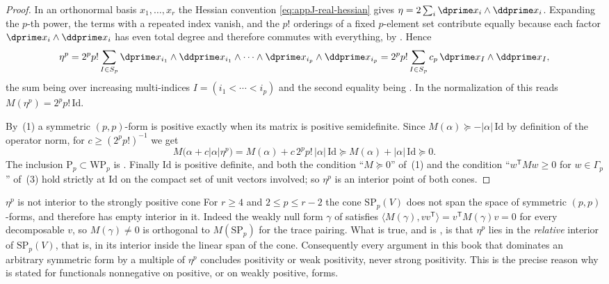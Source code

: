 \begin{proof}
In an orthonormal basis $x_1,\ldots,x_r$ the Hessian convention
\eqref{eq:appJ-real-hessian} gives
$\eta=2\sum_i\dprime x_i\wedge\ddprime x_i$.  Expanding the $p$-th power, the
terms with a repeated index vanish, and the $p!$ orderings of a fixed
$p$-element set contribute equally because each factor
$\dprime x_i\wedge\ddprime x_i$ has even total degree and therefore commutes
with everything, by .  Hence
\[
 \eta^{p}=2^{p}p!\sum_{I\in S_p}
   \dprime x_{i_1}\wedge\ddprime x_{i_1}\wedge\cdots
   \wedge\dprime x_{i_p}\wedge\ddprime x_{i_p}
 =2^{p}p!\sum_{I\in S_p}c_p\,\dprime x_I\wedge\ddprime x_I,
\]
the sum being over increasing multi-indices $I=(i_1<\cdots<i_p)$ and the
second equality being .  In the normalization of
 this reads $M(\eta^p)=2^pp!\,\mathrm{Id}$.

By \,(1) a symmetric $(p,p)$-form is
positive exactly when its matrix is positive semidefinite.  Since
$M(\alpha)\succeq-|\alpha|\,\mathrm{Id}$ by definition of the operator norm,
for $c\ge(2^pp!)^{-1}$ we get
\[
 M\bigl(\alpha+c|\alpha|\eta^p\bigr)
 =M(\alpha)+c\,2^pp!\,|\alpha|\,\mathrm{Id}
 \succeq M(\alpha)+|\alpha|\,\mathrm{Id}\succeq0 .
\]
The inclusion $\mathrm{P}_p\subset\mathrm{WP}_p$ is
.  Finally $\mathrm{Id}$ is positive
definite, and both the condition ``$M\succeq0$'' of
\,(1) and the condition
``$w^{\mathsf T}Mw\ge0$ for $w\in\Gamma_p$'' of
\,(3) hold strictly at $\mathrm{Id}$ on
the compact set of unit vectors involved; so $\eta^p$ is an interior point of
both cones.
\end{proof}

\par\noindent\begin{minipage}{\linewidth}
\begin{warning}{$\eta^p$ is not interior to the strongly positive cone}
For $r\ge4$ and $2\le p\le r-2$ the cone $\mathrm{SP}_p(V)$ does not span the
space of symmetric $(p,p)$-forms, and therefore has empty interior in it.
Indeed the weakly null form $\gamma$ of  satisfies
$\langle M(\gamma),vv^{\mathsf T}\rangle=v^{\mathsf T}M(\gamma)v=0$ for every
decomposable $v$, so $M(\gamma)\neq0$ is orthogonal to
$M(\mathrm{SP}_p)$ for the trace pairing.  What is true, and is
\cite[Proposition~1.2.13]{CLD25}, is that $\eta^p$ lies in the
\emph{relative} interior of $\mathrm{SP}_p(V)$, that is, in its interior
inside the linear span of the cone.  Consequently every argument in this book
that dominates an arbitrary symmetric form by a multiple of $\eta^p$
concludes positivity or weak positivity, never strong positivity.  This is
the precise reason why  is stated for
functionals nonnegative on positive, or on weakly positive, forms.
\end{warning}
\end{minipage}\par

